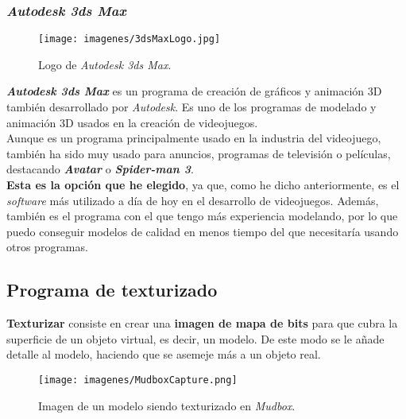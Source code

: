 \subsubsection{\textit{Autodesk 3ds Max}}
	
	
	\begin{wrapfigure}{r}{0.6\textwidth}
		\vspace{-30pt}
		\begin{center}
			\vspace{-30pt}
			\texttt{[image: imagenes/3dsMaxLogo.jpg]}
			\caption{Logo de \textit{Autodesk 3ds Max}.}
			\vspace{-20pt}
		\end{center}
		\vspace{-30pt}
	\end{wrapfigure}

\textbf{\textit{Autodesk 3ds Max}} es un programa de creación de gráficos y animación 3D también desarrollado por \textit{Autodesk}. Es uno de los programas de modelado y animación 3D usados en la creación de videojuegos.
\\
	
Aunque es un programa principalmente usado en la industria del videojuego, también ha sido muy usado para anuncios, programas de televisión o películas, destacando \textbf{\textit{Avatar}} o \textbf{\textit{Spider-man 3}}.
\\

\textbf{Esta es la opción que he elegido}, ya que, como he dicho anteriormente, es el \textit{software} más utilizado a día de hoy en el desarrollo de videojuegos. Además, también es el programa con el que tengo más experiencia modelando, por lo que puedo conseguir modelos de calidad en menos tiempo del que necesitaría usando otros programas.
\\
	
	
	
	
	\subsection{Programa de texturizado}
	
\textbf{Texturizar} consiste en crear una \textbf{imagen de mapa de bits} para que cubra la superficie de un objeto virtual, es decir, un modelo. De este modo se le añade detalle al modelo, haciendo que se asemeje más a un objeto real.
\\

	\begin{figure}[H]
		
		\vspace{-10pt}
		\begin{center}
			
			\texttt{[image: imagenes/MudboxCapture.png]}
			\caption{Imagen de un modelo siendo texturizado en \textit{Mudbox}.}
		\end{center}
		\vspace{-40pt}
	\end{figure}
	
